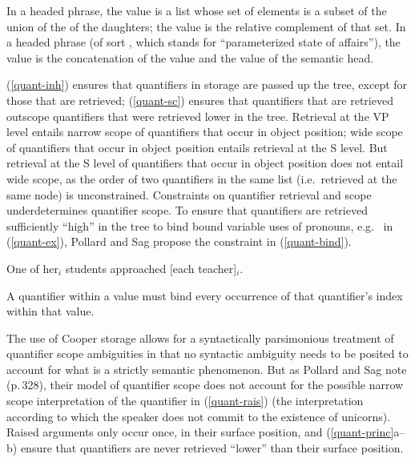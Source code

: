 \documentclass[output=paper]{langsci/langscibook}
\begin{document}
\eal \label{quant-princ}
\ex\label{quant-inh}
In a headed phrase, the  value is a list whose set of elements is a subset of the union of the  of the daughters; the  value is the relative complement of that set.
\ex\label{quant-sc}
In a headed phrase (of sort , which stands for ``parameterized state of affairs''), the  value is the concatenation of the  value and the  value of the semantic head.
\zl


(\ref{quant-inh}) ensures that quantifiers in storage are passed up the tree, except for those that are retrieved; (\ref{quant-sc}) ensures that quantifiers that are retrieved outscope quantifiers that were retrieved lower in the tree. Retrieval at the VP level entails narrow scope of quantifiers that occur in object position; wide scope of quantifiers that occur in object position entails retrieval at the S level. But retrieval at the S level of quantifiers that occur in object position does not entail wide scope, as the order of two quantifiers in the same  list (i.e.\ retrieved at the same node) is unconstrained. Constraints on quantifier retrieval and scope underdetermines quantifier scope. To ensure that quantifiers are retrieved sufficiently ``high'' in the tree to bind bound variable uses of pronouns, e.g.\  in (\ref{quant-ex}), Pollard and Sag propose the constraint in (\ref{quant-bind}).

\begin{exe}
\ex\label{quant-ex}
One of her$_{i}$ students approached [each teacher]$_{i}$. \citep[Example 27a]{PollardandSag1994}
\end{exe}

\begin{exe}
\ex\label{quant-bind}A quantifier within a  value must bind every occurrence of that quantifier's index within that  value.  
\end{exe}

The use of Cooper storage allows for a syntactically parsimonious treatment of quantifier scope ambiguities in that no syntactic ambiguity needs to be posited to account for what is a strictly semantic phenomenon. But as Pollard and Sag note (p.\,328), their model of quantifier scope does not account for the possible narrow scope interpretation of the quantifier  in (\ref{quant-rais}) (the interpretation according to which the speaker does not commit to the existence of unicorns). Raised arguments only occur once, in their surface position, and (\ref{quant-princ}a--b) ensure that quantifiers are never retrieved ``lower'' than their surface position.
\end{document}
